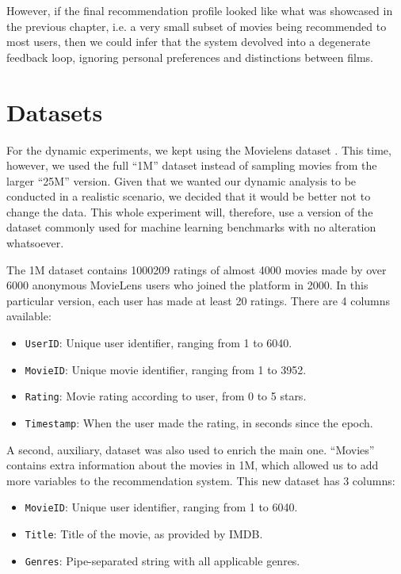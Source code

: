 However, if the final recommendation profile looked like what was showcased in
the previous chapter, i.e. a very small subset of movies being recommended to
most users, then we could infer that the system devolved into a degenerate
feedback loop, ignoring personal preferences and distinctions between films.

\section{Datasets}
\label{sec:datasets04}

For the dynamic experiments, we kept using the Movielens dataset \citep{}. This
time, however, we used the full ``1M'' dataset instead of sampling movies from
the larger ``25M'' version. Given that we wanted our dynamic analysis to be
conducted in a realistic scenario, we decided that it would be better not to
change the data. This whole experiment will, therefore, use a version of the
dataset commonly used for machine learning benchmarks with no alteration
whatsoever.

The 1M dataset contains 1000209 ratings of almost 4000 movies made by over 6000
anonymous MovieLens users who joined the platform in 2000. In this particular
version, each user has made at least 20 ratings. There are 4 columns available:

\begin{itemize}
  \item \verb|UserID|: Unique user identifier, ranging from 1 to 6040.
  \item \verb|MovieID|: Unique movie identifier, ranging from 1 to 3952.
  \item \verb|Rating|: Movie rating according to user, from 0 to 5 stars.
  \item \verb|Timestamp|: When the user made the rating, in seconds since the
  epoch.
\end{itemize}

A second, auxiliary, dataset was also used to enrich the main one. ``Movies''
contains extra information about the movies in 1M, which allowed us to add more
variables to the recommendation system. This new dataset has 3 columns:

\begin{itemize}
  \item \verb|MovieID|: Unique user identifier, ranging from 1 to 6040.
  \item \verb|Title|: Title of the movie, as provided by IMDB.
  \item \verb|Genres|: Pipe-separated string with all applicable genres.
\end{itemize}

